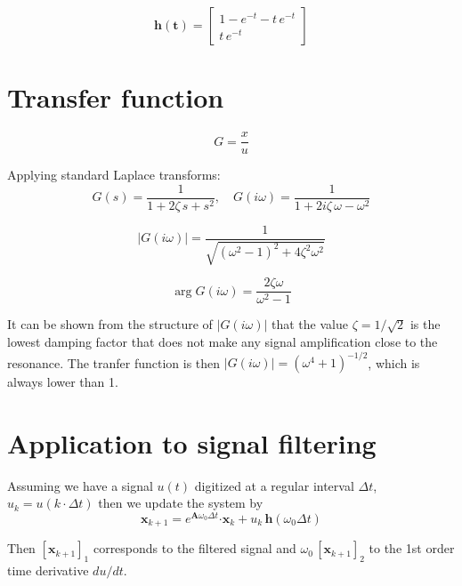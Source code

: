 \documentclass[11pt,a4paper]{article}
\begin{document}
\begin{equation}
\mathbf{h(t)} = 
\left[\begin{matrix}
 1 - e^{-t} - t\, e^{-t} \\
 t\,e^{-t}
\end{matrix}\right] 
\end{equation}

\section{Transfer function}

\begin{equation}\label{key}
G = \frac{x}{u}
\end{equation}

Applying standard Laplace transforms:
\begin{equation}\label{key}
G(s) = \frac{1}{1 + 2\zeta \, s + s^2}, \quad G(i\omega) = \frac{1}{1 + 2i \zeta \, \omega - \omega^2}
\end{equation}

\begin{equation}\label{key}
|G(i\omega)| = \frac{1}{\sqrt{(\omega^2-1)^2 + 4\zeta^2\omega^2}}
\end{equation}

\begin{equation}\label{key}
\arg G(i\omega) = \frac{2\zeta\omega}{\omega^2-1}
\end{equation}

It can be shown from the structure of $|G(i\omega)|$ that the value $\zeta = 1/\sqrt{2}$ is the lowest damping factor that does not make any signal amplification close to the resonance. The tranfer function is then $|G(i\omega)|=(\omega^4+1)^{-1/2}$, which is always lower than 1.

\section{Application to signal filtering}

Assuming we have a signal $u(t)$ digitized at a regular interval $\Delta t$, $u_k = u(k\cdot \Delta t)$ then we update the system by
\begin{equation}\label{key}
\mathbf{x}_{k+1} =   e^{\mathbf{A} \omega_0 \Delta t}\mathbf{\cdot x}_k + 
u_k \, \mathbf{h}(\omega_0 \Delta t)
\end{equation}

Then $[\mathbf{x}_{k+1}]_1$ corresponds to the filtered signal and  $\omega_0\, [\mathbf{x}_{k+1}]_2$ to the 1st order time derivative $du/dt$.
\end{document}
